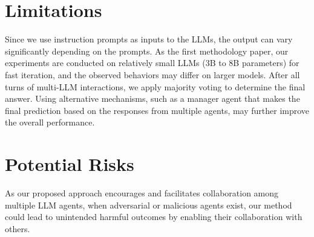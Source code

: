 \section*{Limitations}
Since we use instruction prompts as inputs to the LLMs, the output can vary significantly depending on the prompts. As the first methodology paper, our experiments are conducted on relatively small LLMs (3B to 8B parameters) for fast iteration, and the observed behaviors may differ on larger models.  
After all turns of multi-LLM interactions, we apply majority voting to determine the final answer. Using alternative mechanisms, such as a manager agent that makes the final prediction based on the responses from multiple agents, may further improve the overall performance. 

\section*{Potential Risks}
As our proposed approach encourages and facilitates collaboration among multiple LLM agents, when adversarial or malicious agents exist, our method could lead to unintended harmful outcomes by enabling their collaboration with others.